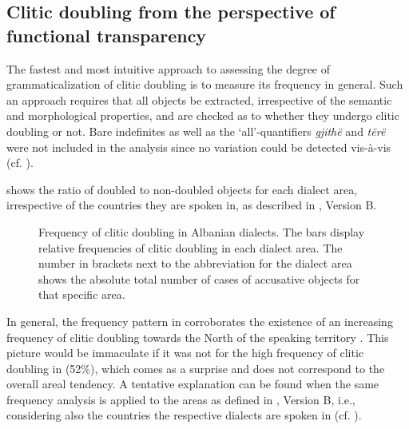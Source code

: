 \documentclass[output=paper]{langsci/langscibook}
\begin{document}
\subsection{Clitic doubling from the perspective of functional transparency}
 
The fastest and most intuitive approach to assessing the degree of grammaticalization of clitic doubling is to measure its frequency in general. Such an approach requires that all objects be extracted, irrespective of the semantic and morphological properties, and are checked as to whether they undergo clitic doubling or not. Bare indefinites as well as the ‘all’-quantifiers \textit{gjithë} and \textit{tërë} were not included in the analysis since no variation could be detected vis-à-vis  (cf. ).

 shows the ratio of doubled to non-doubled objects for each dialect area, irrespective of the countries they are spoken in, as described in , Version B.   

\begin{figure}
\footnotesize
\caption{Frequency of clitic doubling in Albanian dialects. The bars display relative frequencies of clitic doubling in each dialect area. The number in brackets next to the abbreviation for the dialect area shows the absolute total number of cases of accusative objects for that specific area.\label{fig7}}
\end{figure}

In general, the frequency pattern in  corroborates the existence of an increasing frequency of clitic doubling towards the North of the  speaking territory \citep[310]{Curtis2012}. This picture would be immaculate if it was not for the high frequency of clitic doubling in  (52\%), which comes as a surprise and does not correspond to the overall areal tendency. A tentative explanation can be found when the same frequency analysis is applied to the areas as defined in , Version B, i.e., considering also the countries the respective dialects are spoken in (cf. ).
\end{document}

